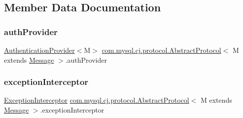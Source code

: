 \subsection{Member Data Documentation}
\mbox{\label{classcom_1_1mysql_1_1cj_1_1protocol_1_1_abstract_protocol_ae55f145d34e30891a841208ec5164c26}} 
\subsubsection{\texorpdfstring{auth\+Provider}{authProvider}}
{\footnotesize\ttfamily \mbox{\hyperlink{interfacecom_1_1mysql_1_1cj_1_1protocol_1_1_authentication_provider}{Authentication\+Provider}}$<$M$>$ \mbox{\hyperlink{classcom_1_1mysql_1_1cj_1_1protocol_1_1_abstract_protocol}{com.\+mysql.\+cj.\+protocol.\+Abstract\+Protocol}}$<$ M extends \mbox{\hyperlink{interfacecom_1_1mysql_1_1cj_1_1protocol_1_1_message}{Message}} $>$.auth\+Provider\hspace{0.3cm}{\ttfamily [protected]}}

\mbox{\label{classcom_1_1mysql_1_1cj_1_1protocol_1_1_abstract_protocol_ab5ecaec9f4472c0cf0d01e4929e0f61e}} 
\subsubsection{\texorpdfstring{exception\+Interceptor}{exceptionInterceptor}}
{\footnotesize\ttfamily \mbox{\hyperlink{interfacecom_1_1mysql_1_1cj_1_1exceptions_1_1_exception_interceptor}{Exception\+Interceptor}} \mbox{\hyperlink{classcom_1_1mysql_1_1cj_1_1protocol_1_1_abstract_protocol}{com.\+mysql.\+cj.\+protocol.\+Abstract\+Protocol}}$<$ M extends \mbox{\hyperlink{interfacecom_1_1mysql_1_1cj_1_1protocol_1_1_message}{Message}} $>$.exception\+Interceptor\hspace{0.3cm}{\ttfamily [protected]}}


